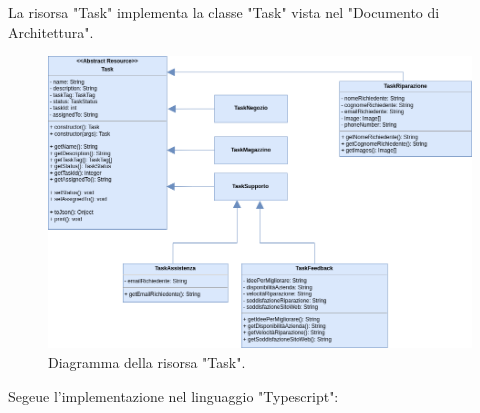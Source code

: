 \documentclass{report}
\begin{document}
La risorsa "Task" implementa la classe "Task" vista nel "Documento di Architettura".

\begin{figure}[H]
	\centering\includegraphics[width=1\textwidth]{images/resource_task.png}
	Diagramma della risorsa "Task".
\end{figure}

Segeue l'implementazione nel linguaggio "Typescript":
\end{document}
